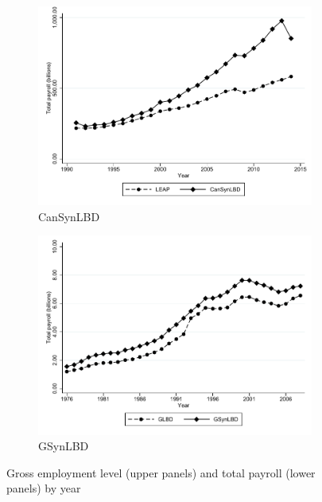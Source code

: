 \begin{figure}
\begin{subfigure}[h]{0.48\linewidth}
\includegraphics[trim=0 0 0 -20,clip,width=\linewidth]{graphs/Total_payroll_by_year_private_bw.pdf}
\caption{CanSynLBD}
\end{subfigure}
\hfill
\begin{subfigure}[h]{0.48\linewidth}
\includegraphics[trim=0 0 0 -20,clip,width=\linewidth]{graphs/Total_payroll_by_year_bw_GsynLBD.pdf}
\caption{GSynLBD}
\end{subfigure}%
\caption{Gross employment level (upper panels) and total payroll (lower panels) by year}
\end{figure}


